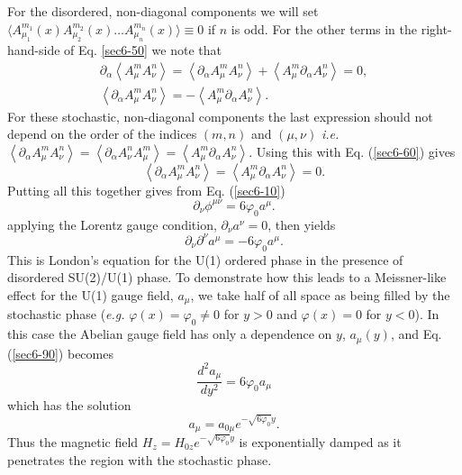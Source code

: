 \documentclass[a4paper,aps,showpacs]{revtex4}
\begin{document}
For the disordered, non-diagonal components we will set
$\langle A^{m_1}_{\mu_1}(x) A^{m_2}_{\mu_2}(x) \ldots A^{m_n}_{\mu_n}(x)
\rangle \equiv 0$  if $n$ is odd. For the other
terms in the right-hand-side of Eq. \eqref{sec6-50} we note that
\begin{eqnarray}
  \partial_\alpha \left\langle A^m_\mu A^n_\nu \right\rangle =
  \left\langle \partial_\alpha A^m_\mu A^n_\nu \right\rangle +
  \left\langle A^m_\mu \partial_\alpha A^n_\nu \right\rangle = 0 ,
\label{sec6-60}\\
  \left\langle \partial_\alpha A^m_\mu A^n_\nu \right\rangle =
  - \left\langle A^m_\mu \partial_\alpha A^n_\nu \right\rangle .
\nonumber
\end{eqnarray}
For these stochastic, non-diagonal components the last expression
should not depend on the order of the indices $(m,n)$ and
$(\mu , \nu)$  \textit{i.e.}
$\left\langle \partial_\alpha A^m_\mu A^n_\nu \right\rangle =
\left\langle \partial_\alpha A^n_\nu A^m_\mu \right\rangle =
\left\langle A^m_\mu \partial_\alpha A^n_\nu \right\rangle$.
Using this with Eq. (\ref{sec6-60}) gives
\begin{equation}
\left\langle \partial_\alpha A^m_\mu A^n_\nu \right\rangle =
\left\langle A^m_\mu \partial_\alpha A^n_\nu \right\rangle = 0.
\label{sec6-70}
\end{equation}
Putting all this together gives from Eq. (\ref{sec6-10})
\begin{equation}
  \partial_\nu \phi ^{\mu\nu} = 6 \varphi_0 a^\mu .
\label{sec6-80}
\end{equation}
applying the Lorentz gauge condition, $\partial_\nu a^\nu = 0$,
then yields
\begin{equation}
  \partial_\nu \partial^\nu a^\mu = -6 \varphi_0 a^\mu .
\label{sec6-90}
\end{equation}
This is London's equation for the U(1) ordered phase
in the presence of disordered SU(2)/U(1) phase. To demonstrate
how this leads to a Meissner-like effect for the U(1) gauge
field, $a_{\mu}$, we take half of all space
as being filled by the stochastic phase  ({\it e.g.}
$\varphi (x)= \varphi_0 \neq 0$ for $y>0$
and $\varphi (x) =0$ for $y<0$).
In this case the Abelian gauge field has only a dependence
on $y$, $a_{\mu} (y)$, and Eq. (\ref{sec6-90}) becomes
\begin{equation}
  \frac{d^2 a_\mu}{dy^2} = 6 \varphi_0 a_\mu
\label{sec7-10}
\end{equation}
which has the solution
\begin{equation}
  a_\mu = a_{0 \mu} e^{-\sqrt{6\varphi_0} y} .
\label{sec7-20}
\end{equation}
Thus the magnetic field $H_z = H_{0z} e^{-\sqrt{6\varphi_0} y}$ is
exponentially damped as it penetrates the region with the
stochastic phase.
\end{document}

